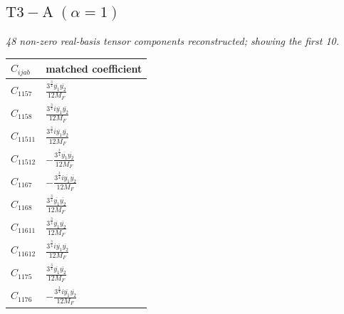 \documentclass[9pt]{article}
\begin{document}
\subsection*{$ \mathrm{T3-A}\;(\alpha=1) $}
\textit{48 non-zero real-basis tensor components reconstructed; showing the first 10.}
\begin{longtable}{@{}ll@{}}
\toprule
$C_{ijab}$ & matched coefficient \\
\midrule
$C_{1157}$ & $ \frac{3^{\frac{3}{4}} \overline{y_{1}} \overline{y_{2}}}{12 M_F} $ \\
$C_{1158}$ & $ \frac{3^{\frac{3}{4}} i \overline{y_{1}} \overline{y_{2}}}{12 M_F} $ \\
$C_{11511}$ & $ \frac{3^{\frac{3}{4}} i \overline{y_{1}} \overline{y_{2}}}{12 M_F} $ \\
$C_{11512}$ & $ - \frac{3^{\frac{3}{4}} \overline{y_{1}} \overline{y_{2}}}{12 M_F} $ \\
$C_{1167}$ & $ - \frac{3^{\frac{3}{4}} i \overline{y_{1}} \overline{y_{2}}}{12 M_F} $ \\
$C_{1168}$ & $ \frac{3^{\frac{3}{4}} \overline{y_{1}} \overline{y_{2}}}{12 M_F} $ \\
$C_{11611}$ & $ \frac{3^{\frac{3}{4}} \overline{y_{1}} \overline{y_{2}}}{12 M_F} $ \\
$C_{11612}$ & $ \frac{3^{\frac{3}{4}} i \overline{y_{1}} \overline{y_{2}}}{12 M_F} $ \\
$C_{1175}$ & $ \frac{3^{\frac{3}{4}} \overline{y_{1}} \overline{y_{2}}}{12 M_F} $ \\
$C_{1176}$ & $ - \frac{3^{\frac{3}{4}} i \overline{y_{1}} \overline{y_{2}}}{12 M_F} $ \\
\bottomrule
\end{longtable}
\end{document}
